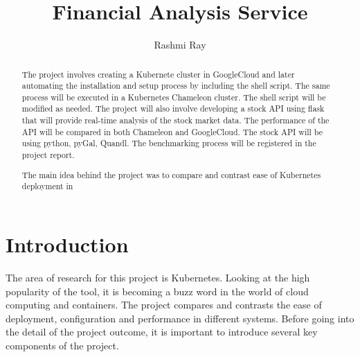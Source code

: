 
\title{Financial Analysis Service}

\author{Rashmi Ray}

\renewcommand{\shortauthors}{Rashmi Ray}

\begin{abstract}
The project involves creating a Kubernete cluster in GoogleCloud and later 
automating the installation and setup process by including the shell script.
The same process will be executed in a Kubernetes Chameleon cluster. The shell
script will be modified as needed. The project will also involve developing a 
stock API using flask that will provide real-time analysis of the stock market 
data. The performance of the API will be compared in both Chameleon and 
GoogleCloud. The stock API will be using python, pyGal, Quandl. The 
benchmarking process will be registered in the project report. 

The main idea behind the project was to compare and contrast ease of 
Kubernetes deployment in 

\end{abstract}



\maketitle

\section{Introduction}

The area of research for this project is Kubernetes. Looking at the high
 popularity of the tool, it is becoming a buzz word in the world of cloud 
 computing and containers. The project compares and contrasts the ease of
  deployment, configuration and performance in different systems. Before going 
  into the detail of the project outcome, it is important to introduce several
   key components of the project.

